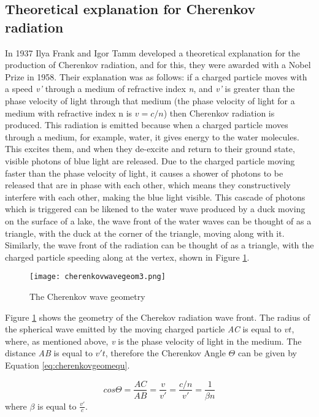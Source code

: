 \documentclass[11pt,oneside,a4paper]{article}
\begin{document}
\subsection{Theoretical explanation for Cherenkov radiation}
In 1937 Ilya Frank and Igor Tamm developed a theoretical explanation for the production of Cherenkov radiation, and for this, they were awarded with a Nobel Prize in 1958. Their explanation was as follows: if a charged particle moves with a speed \textit{v'} through a medium of refractive index \textit{n}, and \textit{v'} is greater than the phase velocity of light through that medium (the phase velocity of light for a medium with refractive index n is $v=c/n$) then Cherenkov radiation is produced. This radiation is emitted because when a charged particle moves through a medium, for example, water, it gives energy to the water molecules. This excites them, and when they de-excite and return to their ground state, visible photons of blue light are released. Due to the charged particle moving faster than the phase velocity of light, it causes a shower of photons to be released that are in phase with each other, which means they constructively interfere with each other, making the blue light visible. This cascade of photons which is triggered can be likened to the water wave produced by a duck moving on the surface of a lake, the wave front of the water waves can be thought of as a triangle, with the duck at the corner of the triangle, moving along with it. Similarly, the wave front of the radiation can be thought of as a triangle, with the charged particle speeding along at the vertex, shown in Figure \ref{fig:cherenkovwavegeom}.


\begin{figure}[htbp]
	\centering
	\texttt{[image: cherenkovwavegeom3.png]}
	\captionsetup{justification=centering}
	\caption{The Cherenkov wave geometry}
	\label{fig:cherenkovwavegeom}
\end{figure}

Figure \ref{fig:cherenkovwavegeom} shows the geometry of the Cherekov radiation wave front. The radius of the spherical wave emitted by the moving charged particle \textit{AC} is equal to \textit{$vt$}, where, as mentioned above, \textit{v} is the phase velocity of light in the medium. The distance \textit{AB} is equal to \textit{$v't$}, therefore the Cherenkov Angle \textit{$\Theta$} can be given by Equation \ref{eq:cherenkovgeomequ}.

\begin{equation}
\label{eq:cherenkovgeomequ}
cos{\Theta}=\frac{AC}{AB}=\frac{v}{v'}=\frac{c/n}{v'}=\frac{1}{\beta n}
\end{equation}
where $\beta$ is equal to $\frac{v'}{c}$.
\end{document}
